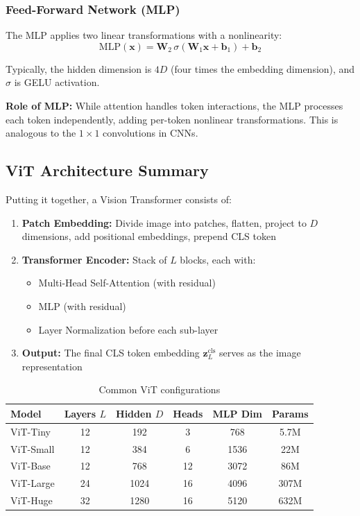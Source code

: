 \subsubsection{Feed-Forward Network (MLP)}

The MLP applies two linear transformations with a nonlinearity:
\begin{equation}
\text{MLP}(\mathbf{x}) = \mathbf{W}_2 \, \sigma(\mathbf{W}_1 \mathbf{x} + \mathbf{b}_1) + \mathbf{b}_2
\label{eq:mlp}
\end{equation}

Typically, the hidden dimension is $4D$ (four times the embedding dimension), and $\sigma$ is GELU activation.

\textbf{Role of MLP:} While attention handles token interactions, the MLP processes each token independently, adding per-token nonlinear transformations. This is analogous to the $1 \times 1$ convolutions in CNNs.

\subsection{ViT Architecture Summary}

Putting it together, a Vision Transformer consists of:

\begin{enumerate}
    \item \textbf{Patch Embedding:} Divide image into patches, flatten, project to $D$ dimensions, add positional embeddings, prepend CLS token

    \item \textbf{Transformer Encoder:} Stack of $L$ blocks, each with:
    \begin{itemize}
        \item Multi-Head Self-Attention (with residual)
        \item MLP (with residual)
        \item Layer Normalization before each sub-layer
    \end{itemize}

    \item \textbf{Output:} The final CLS token embedding $\mathbf{z}_L^{\text{cls}}$ serves as the image representation
\end{enumerate}

\begin{table}[htbp]
\centering
\caption{Common ViT configurations}
\label{tab:vit_configs}
\begin{tabular}{lccccc}
\toprule
\textbf{Model} & \textbf{Layers} $L$ & \textbf{Hidden} $D$ & \textbf{Heads} & \textbf{MLP Dim} & \textbf{Params} \\
\midrule
ViT-Tiny & 12 & 192 & 3 & 768 & 5.7M \\
ViT-Small & 12 & 384 & 6 & 1536 & 22M \\
ViT-Base & 12 & 768 & 12 & 3072 & 86M \\
ViT-Large & 24 & 1024 & 16 & 4096 & 307M \\
ViT-Huge & 32 & 1280 & 16 & 5120 & 632M \\
\bottomrule
\end{tabular}
\end{table}

